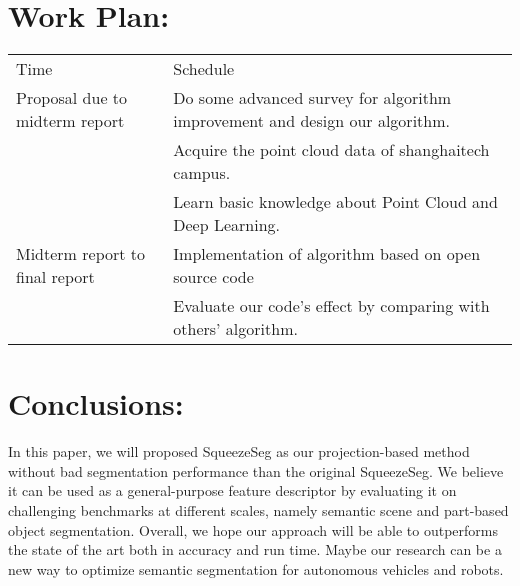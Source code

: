 \documentclass{article}
\begin{document}
\begin{normalsize}
    	\section{Work Plan:}
        
        \begin{table}[h]
            \begin{tabular}{ll}
            Time                           & Schedule                                                                    &  \\
            Proposal due to midterm report & Do some advanced survey for algorithm improvement and design our algorithm. &  \\
            & Acquire the point cloud data of shanghaitech campus.                        &  \\
                                           & Learn basic knowledge about Point Cloud and Deep Learning.                  &  \\
            Midterm report to final report & Implementation of algorithm based on open source code                       &  \\
                                           & Evaluate our code’s effect by comparing with others’ algorithm.             &  \\
            \end{tabular}
            \end{table}    

       \section{Conclusions:}
        In this paper, we will proposed SqueezeSeg as our projection-based method without bad segmentation performance than the original SqueezeSeg. We believe it can be used as a general-purpose feature descriptor by evaluating it on challenging benchmarks at different scales, namely semantic scene and part-based object segmentation. Overall, we hope our approach will be able to outperforms the state of the art both in accuracy and run time. Maybe our research can be a new way to optimize semantic segmentation for autonomous vehicles and robots. 
        
    

\end{normalsize}
  
\end{document}
